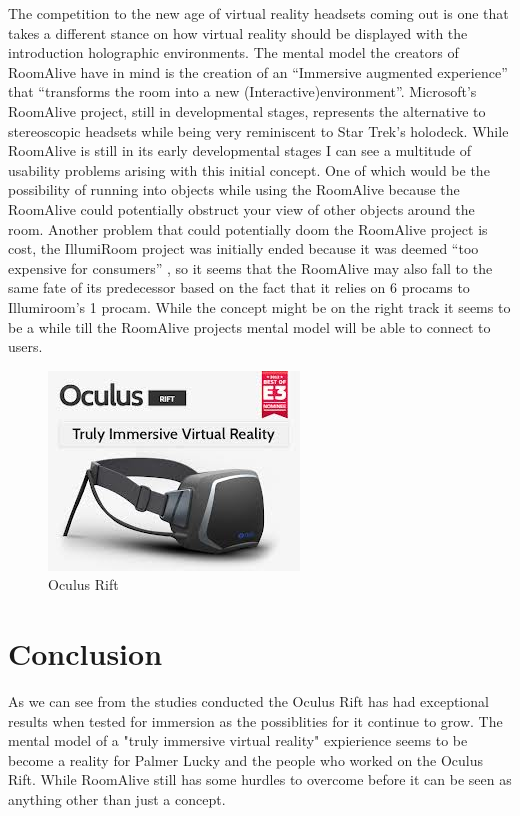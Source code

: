 \documentclass[a4paper]{article}
\begin{document}
\indent The competition to the new age of virtual reality headsets coming out is one that takes a different stance on how virtual reality should be displayed with the introduction holographic environments. The mental model the creators of RoomAlive have in mind is the creation of an “Immersive augmented experience”  that “transforms the room into a new (Interactive)environment”\cite{6}. Microsoft’s RoomAlive project, still in developmental stages, represents the alternative to stereoscopic headsets while being very reminiscent to Star Trek’s holodeck. While RoomAlive is still in its early developmental stages I can see a multitude of usability problems arising with this initial concept. One of which would be the possibility of running into objects while using the RoomAlive because the RoomAlive could potentially obstruct your view of other objects around the room. Another problem that could potentially doom the RoomAlive project is cost, the IllumiRoom project was initially ended because it was deemed “too expensive for consumers” \cite{6},
so it seems that the RoomAlive may also fall to the same fate of its predecessor based on the fact that it relies on 6 procams to Illumiroom's 1 procam. While the concept might be on the right track it seems to be a while till the RoomAlive projects mental model will be able to connect to users.


\begin{figure}
\centering
\includegraphics[scale=0.4]{OculusRift.jpg}
\caption{Oculus Rift}
\end{figure}





\section{Conclusion}

\indent \indent As we can see from the studies conducted the Oculus Rift has had exceptional results when tested for immersion as the possiblities for it continue to grow. The mental model of a "truly immersive virtual reality"\cite{3} expierience seems to be become a reality for Palmer Lucky and the people who worked on the Oculus Rift. While RoomAlive still has some hurdles to overcome before it can be seen as anything other than just a concept. 
\end{document}

